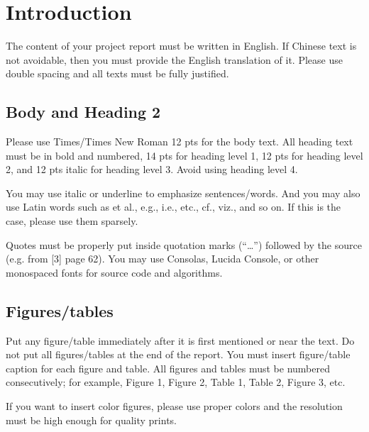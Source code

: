 \section{Introduction}
The content of your project report must be written in English. If Chinese text is not avoidable, then you must provide the English translation of it. Please use double spacing and all texts must be fully justified.

\subsection{Body and Heading 2}
Please use Times/Times New Roman 12 pts for the body text. All heading text must be in bold and numbered, 14 pts for heading level 1, 12 pts for heading level 2, and 12 pts italic for heading level 3. Avoid using heading level 4.


You may use italic or underline to emphasize sentences/words. And you may also use Latin words such as et al., e.g., i.e., etc., cf., viz., and so on. If this is the case, please use them sparsely.


Quotes must be properly put inside quotation marks (“…”) followed by the source (e.g. from [3] page 62). You may use Consolas, Lucida Console, or other monospaced fonts for source code and algorithms.


\subsection{Figures/tables}

Put any figure/table immediately after it is first mentioned or near the text. Do not put all figures/tables at the end of the report. You must insert figure/table caption for each figure and table. All figures and tables must be numbered consecutively; for example, Figure 1, Figure 2, Table 1, Table 2, Figure 3, etc. 


If you want to insert color figures, please use proper colors and the resolution must be high enough for quality prints. 
